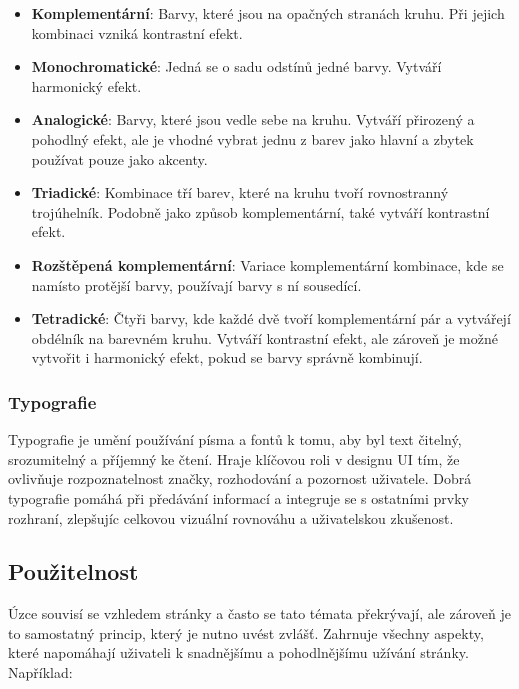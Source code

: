\begin{itemize}
    \item \textbf{Komplementární}: Barvy, které jsou na opačných stranách kruhu. Při jejich kombinaci vzniká kontrastní efekt.
    \item \textbf{Monochromatické}: Jedná se o sadu odstínů jedné barvy. Vytváří harmonický efekt.
    \item \textbf{Analogické}: Barvy, které jsou vedle sebe na kruhu. Vytváří přirozený a pohodlný efekt, ale je vhodné vybrat jednu z barev jako hlavní a zbytek používat pouze jako akcenty.
    \item \textbf{Triadické}: Kombinace tří barev, které na kruhu tvoří rovnostranný trojúhelník. Podobně jako způsob komplementární, také vytváří kontrastní efekt.
    \item \textbf{Rozštěpená komplementární}: Variace komplementární kombinace, kde se namísto protější barvy, používají barvy s ní sousedící. 
    \item \textbf{Tetradické}: Čtyři barvy, kde každé dvě tvoří komplementární pár a vytvářejí obdélník na barevném kruhu. Vytváří kontrastní efekt, ale zároveň je možné vytvořit i harmonický efekt, pokud se barvy správně kombinují.
\end{itemize}

\subsubsection{Typografie}
Typografie je umění používání písma a fontů k tomu, aby byl text čitelný, srozumitelný a příjemný ke čtení. Hraje klíčovou roli v designu UI tím, že ovlivňuje rozpoznatelnost značky, rozhodování a pozornost uživatele. Dobrá typografie pomáhá při předávání informací a integruje se s ostatními prvky rozhraní, zlepšujíc celkovou vizuální rovnováhu a uživatelskou zkušenost.

\subsection{Použitelnost}
Úzce souvisí se vzhledem stránky a často se tato témata překrývají, ale zároveň je to samostatný princip, který je nutno uvést zvlášť. Zahrnuje všechny aspekty, které napomáhají uživateli k snadnějšímu a pohodlnějšímu užívání stránky. Například:

